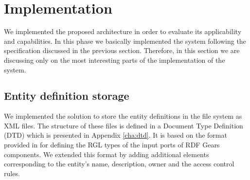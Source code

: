 \section{Implementation}
\label{sec:implStorage}

We implemented the proposed architecture in order to evaluate its applicability and capabilities. In this phase we basically implemented the system following the specification discussed in the previous section. Therefore, in this section we are discussing only on the most interesting parts of the implementation of the system.

\subsection{Entity definition storage}
We implemented the solution to store the entity definitions in the file system as XML files. The structure of these files is defined in a Document Type Definition (DTD) which is presented in Appendix \ref{cha:dtd}. It is based on the format provided in \cite{maro2011} for defining the RGL types of the input ports of RDF Gears components. We extended this format by adding additional elements corresponding to the entity's name, description, owner and the access control rules.

